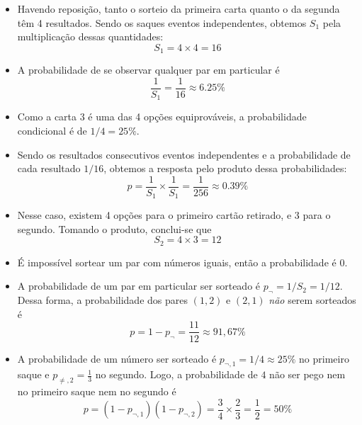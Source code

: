 \documentclass{article}
\begin{document}
\begin{itemize}

\item [a)] Havendo reposição, tanto o sorteio da primeira carta quanto o da segunda têm 4 resultados. 
Sendo os saques eventos independentes, obtemos $S_1$ pela multiplicação dessas quantidades:
%
\begin{equation*}
\boxed{
    S_1 = 4 \times 4 = 16
}
\end{equation*}

\item [b)] A probabilidade de se observar qualquer par em particular é 
%
\begin{equation*}
\boxed{
\frac{1}{S_1} = \frac{1}{16} 
              \approx 6.25\%
}
\end{equation*}

\item [c)] Como a carta 3 é uma das 4 opções equiprováveis, a probabilidade condicional é de 
$1/4 = 25\%$. 

\item [d)] Sendo os resultados consecutivos eventos independentes e a probabilidade de cada resultado $1/16$, obtemos a resposta pelo produto dessa probabilidades:
%
\begin{equation*}
\boxed{
    p = \frac{1}{S_1} \times \frac{1}{S_1}
      = \frac{1}{256}
      \approx 0.39\%
}
\end{equation*}

\item [e)] Nesse caso, existem 4 opções para o primeiro cartão retirado, e 3 para o segundo. Tomando o produto, conclui-se que
%
\begin{equation*}
\boxed{
    S_2 = 4 \times 3 
        = 12
}
\end{equation*}

\item [f)] É impossível sortear um par com números iguais, então a probabilidade é 0.
\item [g)] A probabilidade de um par em particular ser sorteado é $p_\neg = 1/S_2 = 1/12$. 
Dessa forma, a probabilidade dos pares $(1,2)$ e $(2,1)$ \emph{não} serem sorteados é 
%
\begin{equation*}
\boxed{
    p = 1 - p_\neg
      = \frac{11}{12}
      \approx 91,67\%
}
\end{equation*}

\item [h)] A probabilidade de um número ser sorteado é 
$p_{\neg, 1} = 1/4 \approx 25\%$
no primeiro saque e 
$p_{\neq, 2} = \frac{1}{3}$ no segundo.
Logo, a probabilidade de $4$ não ser pego nem no primeiro saque nem no segundo é
%
\begin{equation*}
\boxed{
    p  = (1 - p_{\neg, 1}) (1 - p_{\neg, 2})
       = \frac{3}{4} \times \frac{2}{3}
       = \frac{1}{2}
       = 50\%
}
\end{equation*}
\end{itemize}
\end{document}
